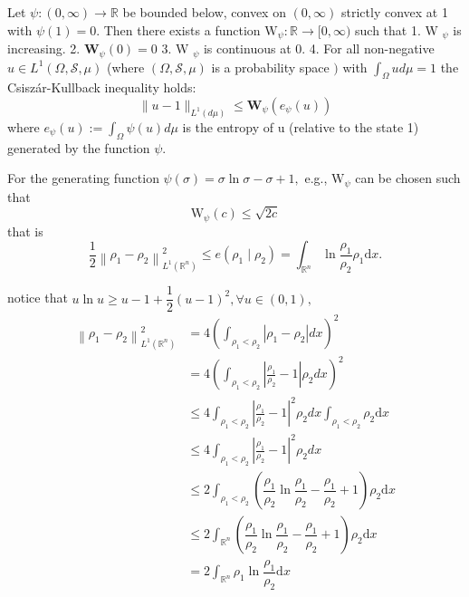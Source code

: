\begin{theorem}
	Let $\psi:(0, \infty) \rightarrow \mathbb{R}$ be bounded below, convex on $(0, \infty)$ strictly convex at 1 with $\psi(1)=0 .$ Then there exists a function $\mathrm{W}_{\psi}: \mathbb{R} \rightarrow[0, \infty)$
	such that
	1. W $_{\psi}$ is increasing.
	2. $\mathbf{W}_{\psi}(0)=0$
	3. W $_{\psi}$ is continuous at 0.
	4. For all non-negative $u \in L^{1}(\Omega, \mathscr{S}, \mu)$ (where $(\Omega, \mathscr{S}, \mu)$ is a probability space $)$ with $\int_{\Omega} u d \mu=1$ the Csiszár-Kullback inequality holds:
	$$
	\|u-1\|_{L^{1}(d \mu)} \leqslant \mathbf{W}_{\psi}\left(e_{\psi}(u)\right)
	$$
	where $e_{\psi}(u):=\int_{\Omega} \psi(u) d \mu$ is the entropy of u (relative to the state 1) generated by the function $\psi$.
\end{theorem}

For the generating function $\psi(\sigma)=\sigma \ln \sigma-\sigma+1,$ e.g.,
$\mathrm{W}_{\psi}$ can be chosen such that
$$
\mathrm{W}_{\psi}(c) \leqslant \sqrt{2 c}
$$
that is 
\begin{equation}
\frac{1}{2}\left\|\rho_{1}-\rho_{2}\right\|_{L^{1}\left(\mathbb{R}^{n}\right)}^{2} \leq e\left(\rho_{1} \mid \rho_{2}\right)=\int_{\mathbb{R}^n}\ln\dfrac{\rho_1}{\rho_2}\rho_{1}\mathrm{d}x.
\end{equation}

notice that $u\ln u \geqslant u - 1 + \dfrac{1}{2}(u-1)^2, \forall u\in(0,1),$ 
\begin{equation}
\begin{split}
\left\|\rho_{1}-\rho_{2}\right\|_{L^{1}\left(\mathbb{R}^{n}\right)}^{2} &=
4 (\int_{\rho_{1}<\rho_{2}}\left|\rho_{1}-\rho_{2}\right| d x)^2\\
&= 4 (\int_{\rho_{1}<\rho_{2}}\left|\frac{\rho_{1}}{\rho_{2}}-1\right|\rho_{2} d x)^2\\
&\leqslant
4 \int_{\rho_{1}<\rho_{2}}\left|\frac{\rho_{1}}{\rho_{2}}-1\right|^2\rho_{2} d x\int_{\rho_{1}<\rho_{2}}\rho_{2}\mathrm{d}x\\
&\leqslant 4 \int_{\rho_{1}<\rho_{2}}\left|\frac{\rho_{1}}{\rho_{2}}-1\right|^2\rho_{2} d x\\
&\leqslant 2 \int_{\rho_{1}<\rho_{2}}(\dfrac{\rho_{1}}{\rho_{2}} \ln \dfrac{\rho_{1}}{\rho_{2}} - \dfrac{\rho_{1}}{\rho_{2}} + 1) \rho_{2} \mathrm{d}x\\
&\leqslant 2 \int_{\mathbb{R}^n} (\dfrac{\rho_{1}}{\rho_{2}} \ln \dfrac{\rho_{1}}{\rho_{2}} - \dfrac{\rho_{1}}{\rho_{2}} + 1) \rho_{2} \mathrm{d}x\\
&= 2 \int_{\mathbb{R}^n} \rho_{1} \ln \dfrac{\rho_{1}}{\rho_{2}} \mathrm{d}x\\
\end{split}
\end{equation}


